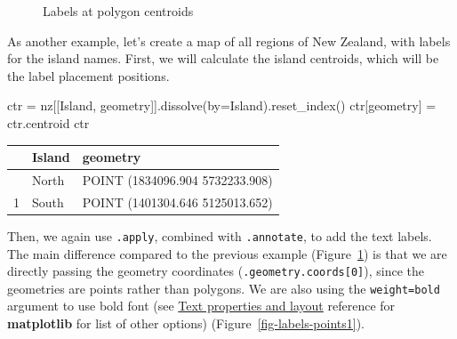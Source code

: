 \documentclass[
  letterpaper,
]{krantz}
\newenvironment{Shaded}{\begin{snugshade}}{\end{snugshade}}
\newcommand{\NormalTok}[1]{\textcolor[rgb]{0.00,0.23,0.31}{#1}}
\newcommand{\OperatorTok}[1]{\textcolor[rgb]{0.37,0.37,0.37}{#1}}
\newcommand{\StringTok}[1]{\textcolor[rgb]{0.13,0.47,0.30}{#1}}
\begin{document}
\begin{figure}[H]


\caption{\label{fig-labels-polygon}Labels at polygon centroids}

\end{figure}%

As another example, let's create a map of all regions of New Zealand,
with labels for the island names. First, we will calculate the island
centroids, which will be the label placement positions.

\begin{Shaded}
\begin{Highlighting}[]
\NormalTok{ctr }\OperatorTok{=}\NormalTok{ nz[[}\StringTok{\textquotesingle{}Island\textquotesingle{}}\NormalTok{, }\StringTok{\textquotesingle{}geometry\textquotesingle{}}\NormalTok{]].dissolve(by}\OperatorTok{=}\StringTok{\textquotesingle{}Island\textquotesingle{}}\NormalTok{).reset\_index()}
\NormalTok{ctr[}\StringTok{\textquotesingle{}geometry\textquotesingle{}}\NormalTok{] }\OperatorTok{=}\NormalTok{ ctr.centroid}
\NormalTok{ctr}
\end{Highlighting}
\end{Shaded}

\begin{longtable}[]{@{}lll@{}}
\toprule\noalign{}
& Island & geometry \\
\midrule\noalign{}
\endhead
\bottomrule\noalign{}
\endlastfoot
0 & North & POINT (1834096.904 5732233.908) \\
1 & South & POINT (1401304.646 5125013.652) \\
\end{longtable}

Then, we again use \texttt{.apply}, combined with \texttt{.annotate}, to
add the text labels. The main difference compared to the previous
example (Figure~\ref{fig-labels-polygon}) is that we are directly
passing the geometry coordinates (\texttt{.geometry.coords{[}0{]}}),
since the geometries are points rather than polygons. We are also using
the \texttt{weight=\textquotesingle{}bold\textquotesingle{}} argument to
use bold font (see
\href{https://matplotlib.org/stable/users/explain/text/text_props.html}{Text
properties and layout} reference for \textbf{matplotlib} for list of
other options) (Figure~\ref{fig-labels-points1}).
\end{document}

